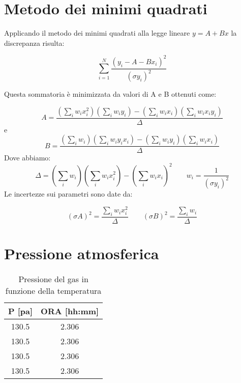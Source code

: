 \begin{appendices}

\section{Metodo dei minimi quadrati}
Applicando il metodo dei minimi quadrati alla legge lineare $ y = A + Bx$ la discrepanza risulta:

\begin{equation}
\displaystyle\sum_{i=1}^{N}\frac{(y_i -A-Bx_i)^2}{(\sigma y_i)^2}
\end{equation}
\hspace{-1.8em}

Questa sommatoria è minimizzata da valori di A e B ottenuti come:

\begin{equation}
\label{eq:a}
A = \frac{(\sum_i w_i x_i^2)(\sum_i w_i y_i)-(\sum_i w_i x_i)(\sum_i w_i x_i y_i)}{\Delta} 
\end{equation}
e
\begin{equation}
\label{eq:b}
B = \frac{(\sum_i w_i)(\sum_i w_i y_i x_i)-(\sum_i w_i y_i)(\sum_i w_i x_i)}{\Delta}
\end{equation}
Dove abbiamo:
\[ \Delta = (\sum_i w_i)(\sum_i w_i x_i^2)-(\sum_i w_i x_i)^2  \quad \quad  w_i = \frac{1}{(\sigma y_i)^2}\]
\hspace{-1.8em}
Le incertezze sui parametri sono date da:

\begin{equation} 
\label{eq:sasb}
(\sigma A)^2 = \frac{\sum_i w_i x_i^2}{\Delta}\quad \quad (\sigma B)^2 = \frac{\sum_i w_i}{\Delta}
\end{equation}

\section{Pressione atmosferica}

\begin{table}[H]
	\centering
	\begin{tabular}{|c|c|} \hline
		\textbf{P {[pa]} } & \textbf{ORA {[hh:mm]} }  \\ \hline
		130.5 & 2.306  \\ \hline
		130.5 & 2.306  \\ \hline
		130.5 & 2.306  \\ \hline
		130.5 & 2.306  \\ \hline
	\end{tabular}
	\caption{Pressione del gas in funzione della temperatura}
\end{table}


\end{appendices}
